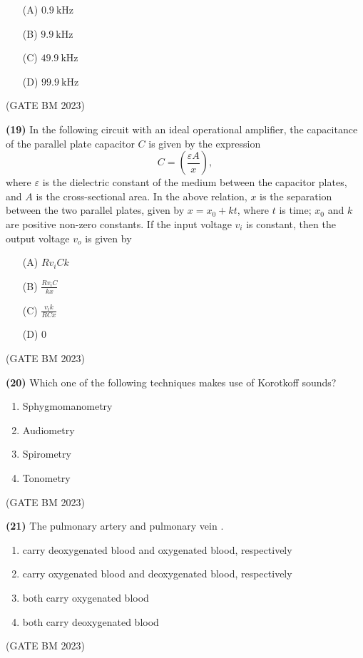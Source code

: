 \documentclass[journal]{IEEEtran}
\numberwithin{equation}{enumi}
\numberwithin{figure}{enumi}
\begin{document}
\begin{enumerate}
    \item[(A)] \( 0.9~\text{kHz} \)
    \item[(B)] \( 9.9~\text{kHz} \)
    \item[(C)] \( 49.9~\text{kHz} \)
    \item[(D)] \( 99.9~\text{kHz} \)
\end{enumerate}
\hfill (GATE BM 2023)

\textbf{(19)}
In the following circuit with an ideal operational amplifier, the capacitance of the parallel plate capacitor \( C \) is given by the expression 
\[
C = \left(\frac{\varepsilon A}{x}\right),
\]
where \( \varepsilon \) is the dielectric constant of the medium between the capacitor plates, and \( A \) is the cross-sectional area. In the above relation, \( x \) is the separation between the two parallel plates, given by \( x = x_0 + kt \), where \( t \) is time; \( x_0 \) and \( k \) are positive non-zero constants. If the input voltage \( v_i \) is constant, then the output voltage \( v_o \) is given by

\begin{enumerate}
    \item[(A)] \( Rv_i Ck \)
    \item[(B)] \( \frac{Rv_i C}{kx} \)
    \item[(C)] \( \frac{v_i k}{RCx} \)
    \item[(D)] \(0\)
\end{enumerate}
\hfill (GATE BM 2023)

\textbf{(20)} Which one of the following techniques makes use of Korotkoff sounds?

\begin{enumerate}[label=(\Alph*)]
    \item Sphygmomanometry 
    \item Audiometry
    \item Spirometry
    \item Tonometry
\end{enumerate}
\hfill (GATE BM 2023)

\textbf{(21)} The pulmonary artery and pulmonary vein \underline{\hspace{3cm}}.
\begin{enumerate}[label=(\Alph*)]
    \item carry deoxygenated blood and oxygenated blood, respectively 
    \item carry oxygenated blood and deoxygenated blood, respectively
    \item both carry oxygenated blood
    \item both carry deoxygenated blood
\end{enumerate}
\hfill (GATE BM 2023)
\end{document}
